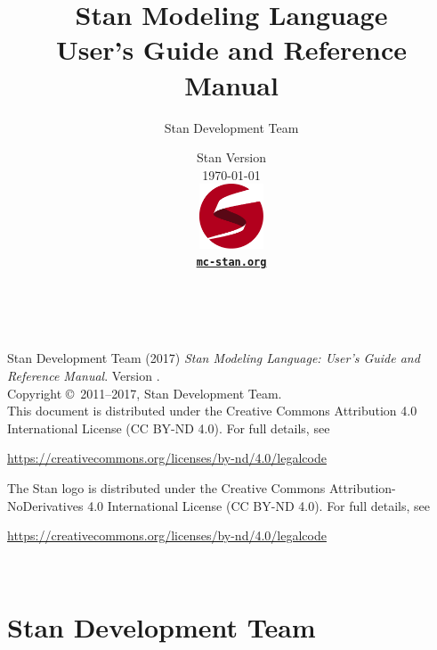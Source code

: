 \title{\Huge\bf Stan Modeling Language \\[4pt] {\LARGE User's Guide
    and Reference Manual}}
\author{Stan Development Team}

\date{\vspace*{36pt} Stan Version \stanversion
\\[8pt] {\small \today}
\\[36pt]
{
\vfill
\includegraphics[width=0.75in]{img/stanlogo-main.pdf}}
\\
\vspace*{6pt}
{\bfseries \href{http://mc-stan.org/}{\tt mc-stan.org}}
}
\maketitle

\newpage
\thispagestyle{empty}
\mbox{ }
\vfill
\begin{center}
\begin{minipage}[t]{0.75\textwidth}
\small
Stan Development Team (2017)
{\it Stan Modeling Language: User's Guide and Reference Manual}. Version
\stanversion.
\vspace*{20pt}
\mbox{ }
\\
Copyright \copyright \ 2011--2017, Stan Development Team.
\vspace*{28pt}
\mbox{} \\
This document is distributed under the Creative Commons Attribution 4.0
International License (CC BY-ND 4.0).  For full details, see
\begin{center}
\url{https://creativecommons.org/licenses/by-nd/4.0/legalcode}
\end{center}
The Stan logo is distributed under the Creative Commons Attribution-NoDerivatives
4.0 International License (CC BY-ND 4.0).  For full details, see
\begin{center}
\url{https://creativecommons.org/licenses/by-nd/4.0/legalcode}
\end{center}
\end{minipage}
\vspace*{24pt}
\mbox{ }
\end{center}

\newpage
\section*{Stan Development Team}

